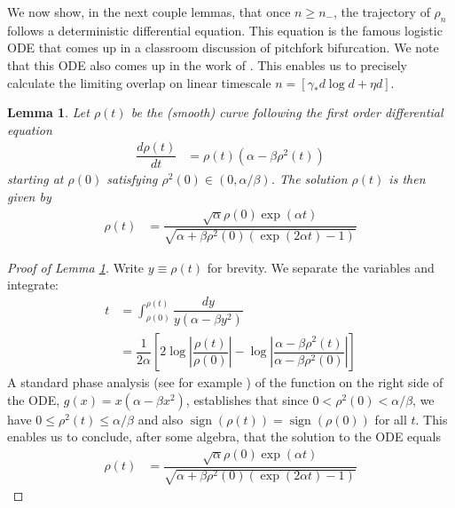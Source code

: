 \documentclass[12pt]{article}
\newtheorem{lemma}[theorem]{Lemma}      %
\DeclareMathOperator{\sign}{sign}
\begin{document}
\medskip

We now show, in the next couple lemmas, that once $n\geq n_-$, the trajectory of $\rho_n$ follows a deterministic differential equation. This equation is the famous logistic ODE \citep{robinson2004introduction} that comes up in a classroom discussion of pitchfork bifurcation. We note that this ODE also comes up in the work of \citet{li2017diffusion}. This enables us to precisely calculate the limiting overlap on linear timescale $n=[\gamma_*d\log d+\eta d]$.

\medskip

\begin{lemma}\label{lemma:ODE_solution}
Let $\rho(t)$ be the (smooth) curve following the first order differential equation
    \begin{align}\label{eqn:ODE}
        \dfrac{d\rho(t)}{dt} &= \rho(t)(\alpha - \beta\rho^2(t))
    \end{align}starting at $\rho(0)$ satisfying $\rho^2(0)\in(0, \alpha/\beta)$. The solution $\rho(t)$ is then given by
    \begin{align*}
        \rho(t) &= \dfrac{\sqrt{\alpha}\rho(0)\exp(\alpha t)}{\sqrt{\alpha +\beta\rho^2(0)(\exp(2\alpha t)-1)}}
    \end{align*}
\end{lemma}

\begin{proof}[Proof of Lemma \ref{lemma:ODE_solution}]
    Write $y\equiv \rho(t)$ for brevity. We separate the variables and integrate:
    \begin{align*}
        t &= \int_{\rho(0)}^{\rho(t)}\dfrac{dy}{y(\alpha - \beta y^2)}\\
        &= \dfrac{1}{2\alpha}\left[2\log\left|\dfrac{\rho(t)}{\rho(0)}\right|-\log\left|\dfrac{\alpha -\beta \rho^2(t)}{\alpha -\beta\rho^2(0)}\right|\right]
    \end{align*}A standard phase analysis (see for example \citet{robinson2004introduction}) of the function on the right side of the ODE, $g(x)=x(\alpha -\beta x^2)$, establishes that since $0<\rho^2(0)<\alpha/\beta$, we have $0\leq \rho^2(t)\leq \alpha/\beta$ and also $\sign(\rho(t))=\sign(\rho(0))$ for all $t$. This enables us to conclude, after some algebra, that the solution to the ODE equals
    \begin{align*}
        \rho(t) &= \dfrac{\sqrt{\alpha}\rho(0)\exp(\alpha t)}{\sqrt{\alpha +\beta\rho^2(0)(\exp(2\alpha t)-1)}}
    \end{align*}
\end{proof}
\end{document}
